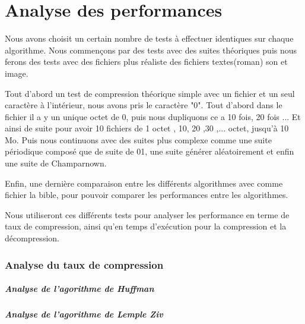 \documentclass{report}
\begin{document}
\part{Analyse des performances}
Nous avons choisit un certain nombre de tests à effectuer identiques sur chaque algorithme. Nous commençons par des tests avec des suites théoriques puis nous ferons des tests avec des fichiers plus réaliste des fichiers textes(roman) son et image.
 
Tout d'abord un test de compression théorique simple avec un fichier et un seul caractère à l'intérieur, nous avons pris le caractère "0".
Tout d'abord dans le fichier il a y un unique octet de 0, puis nous dupliquons ce a 10 fois, 20 fois ... Et ainsi de suite pour avoir 10 fichiers de 1 octet , 10, 20 ,30 ,...  octet, jusqu'à 10 Mo.
Puis nous continuons avec des suites plus complexe comme une suite périodique composé que de suite de 01, une suite générer aléatoirement et enfin une suite de Champarnown.  

Enfin, une dernière comparaison entre les différents algorithmes avec comme fichier la bible, pour pouvoir comparer les performances entre les algorithmes.

Nous utiliseront ces différents tests pour analyser les performance en terme de taux de compression, ainsi qu'en temps d’exécution pour la compression et la décompression. 
\section*{Analyse du taux de compression}
\subsubsection{ Analyse de l'agorithme de Huffman}



\subsubsection{ Analyse de l'agorithme de Lemple Ziv}
\end{document}
